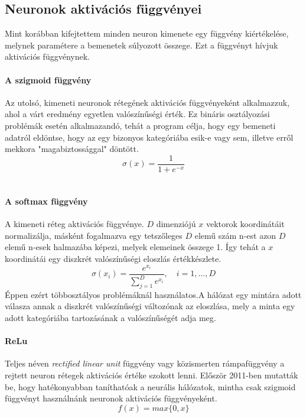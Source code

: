 \subsection{Neuronok aktivációs függvényei}
Mint korábban kifejtettem minden neuron kimenete egy függvény kiértékelése, melynek paramétere a bemenetek súlyozott összege. Ezt a függvényt hívjuk aktivációs függvénynek. 

\paragraph{A szigmoid függvény}
Az utolsó, kimeneti neuronok rétegének aktivációs függvényeként alkalmazzuk, ahol a várt eredmény egyetlen valószínűségi érték. Ez bináris osztályozási problémák esetén alkalmazandó, tehát a program célja, hogy egy bemeneti adatról eldöntse, hogy az egy bizonyos kategóriába esik-e vagy sem, illetve erről mekkora "magabiztossággal" döntött.
\begin{equation}
	\sigma(x)= \frac{1}{1+e^{-x}}
	\label{eq:sigmoid}
\end{equation}\

\paragraph{A softmax függvény}
A kimeneti réteg aktivációs függvénye. $D$ dimenziójú $x$ vektorok koordinátáit normalizálja, másként fogalmazva egy tetszőleges $D$ elemű szám n-est azon $D$ elemű n-esek halmazába képezi, melyek elemeinek összege 1. Így tehát a $x$ koordinátái egy diszkrét valószínűségi eloszlás értékkészlete.\cite{wiki:softmax}
\begin{equation}
\sigma(x_i)=\frac{e^{x_i}}{\sum_{j=1}^{D}e^{x_i}},\quad i = 1,\dots,D
\label{eq:softmax}
\end{equation}
Éppen ezért többosztályos problémáknál használatos.A hálózat egy mintára adott válasza annak a diszkrét valószínűségi változónak az eloszlása, mely a minta egy adott kategóriába tartozásának a valószínűségét adja meg.

\paragraph{ReLu}
Teljes néven \emph{rectified linear unit} függvény vagy közismerten rámpafüggvény a rejtett neuron rétegek aktivációs értéke szokott lenni. Először 2011-ben mutatták be, hogy hatékonyabban taníthatóak a neurális hálózatok, mintha csak szigmoid függvényt használnánk neuronok aktivációs függvényeként.\cite{wiki:relu}
\begin{equation}
	f(x) = max\{0,x\}
	\label{eq:relu}
\end{equation}

